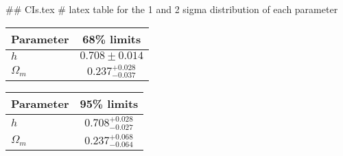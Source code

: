## CIs.tex
# latex table for the 1 and 2 sigma distribution of each parameter

\begin{tabular} { l  c}
 Parameter &  68\% limits\\
\hline
{\boldmath$h              $} & $0.708\pm 0.014            $\\
{\boldmath$\Omega_m       $} & $0.237^{+0.028}_{-0.037}   $\\
\hline
\end{tabular}

\begin{tabular} { l  c}
 Parameter &  95\% limits\\
\hline
{\boldmath$h              $} & $0.708^{+0.028}_{-0.027}   $\\
{\boldmath$\Omega_m       $} & $0.237^{+0.068}_{-0.064}   $\\
\hline
\end{tabular}
